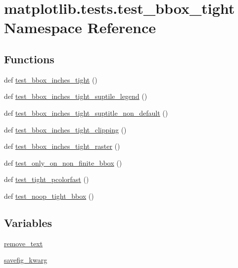 \hypertarget{namespacematplotlib_1_1tests_1_1test__bbox__tight}{}\section{matplotlib.\+tests.\+test\+\_\+bbox\+\_\+tight Namespace Reference}
\label{namespacematplotlib_1_1tests_1_1test__bbox__tight}
\subsection*{Functions}
\begin{DoxyCompactItemize}
\item 
def \hyperlink{namespacematplotlib_1_1tests_1_1test__bbox__tight_aa89f24ace2c493cd531605b852f89009}{test\+\_\+bbox\+\_\+inches\+\_\+tight} ()
\item 
def \hyperlink{namespacematplotlib_1_1tests_1_1test__bbox__tight_adf4c3f897183378c8ccc4a0d71cc02c9}{test\+\_\+bbox\+\_\+inches\+\_\+tight\+\_\+suptile\+\_\+legend} ()
\item 
def \hyperlink{namespacematplotlib_1_1tests_1_1test__bbox__tight_a5cec5e65ee98ff693080db854f1e5387}{test\+\_\+bbox\+\_\+inches\+\_\+tight\+\_\+suptitle\+\_\+non\+\_\+default} ()
\item 
def \hyperlink{namespacematplotlib_1_1tests_1_1test__bbox__tight_ab5607489170934c9ad026364d90f2628}{test\+\_\+bbox\+\_\+inches\+\_\+tight\+\_\+clipping} ()
\item 
def \hyperlink{namespacematplotlib_1_1tests_1_1test__bbox__tight_a46f1fe4a248469ac6a4519643d70ff53}{test\+\_\+bbox\+\_\+inches\+\_\+tight\+\_\+raster} ()
\item 
def \hyperlink{namespacematplotlib_1_1tests_1_1test__bbox__tight_af45a7b5b4ed5bfad5924826b54eecd3d}{test\+\_\+only\+\_\+on\+\_\+non\+\_\+finite\+\_\+bbox} ()
\item 
def \hyperlink{namespacematplotlib_1_1tests_1_1test__bbox__tight_af7162f91e11e8522fa7c1c145c9f4dff}{test\+\_\+tight\+\_\+pcolorfast} ()
\item 
def \hyperlink{namespacematplotlib_1_1tests_1_1test__bbox__tight_a2e607eb3dbf22db2b71ad23eedf13605}{test\+\_\+noop\+\_\+tight\+\_\+bbox} ()
\end{DoxyCompactItemize}
\subsection*{Variables}
\begin{DoxyCompactItemize}
\item 
\hyperlink{namespacematplotlib_1_1tests_1_1test__bbox__tight_a4978d156483b1c7db71800addab76139}{remove\+\_\+text}
\item 
\hyperlink{namespacematplotlib_1_1tests_1_1test__bbox__tight_ae15557f465640e217932ff1821cf0c69}{savefig\+\_\+kwarg}
\end{DoxyCompactItemize}


